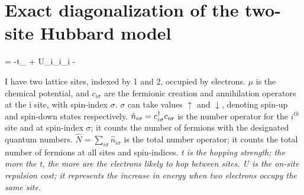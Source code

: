 \documentclass{article}
\begin{document}
\begin{titlepage}

\end{titlepage}

\section{Exact diagonalization of the two-site Hubbard model}

\beq
\ham = -t\sum_\sigma{} + U\sum_i_{i\uparrow}_{i\downarrow} -\mu {}
\eeq

I have two lattice sites, indexed by 1 and 2, occupied by electrons. \(\mu\) is the chemical potential,  and \(c_{i\sigma}\) are the fermionic creation and annihilation operators at the i site, with spin-index \(\sigma\). \(\sigma\) can take values \(\uparrow\) and \(\downarrow\), denoting spin-up and spin-down states respectively. \(\hat{n}_{i\sigma}=c_{{i}{\sigma}}^\dagger c_{{i}{\sigma}}\) is the number operator for the \(i^{th}\) site and at spin-index \(\sigma\); it counts the number of fermions with the designated quantum numbers. \(\hat{N}= \sum_{i\sigma}\hat{n}_{i\sigma}\) is the total number operator; it counts the total number of fermions at all sites and spin-indices. \it t is the hopping strength; the more the t, the more are the electrons likely to hop between sites. \it U is the on-site repulsion cost; it represents the increase in energy when two electrons occupy the same site.
\end{document}
